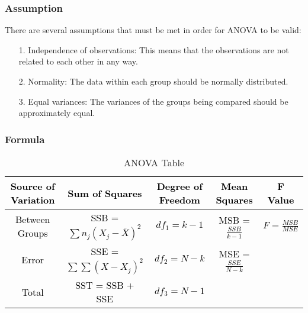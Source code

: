 \documentclass[a4paper]{article}
\begin{document}
	\subsubsection{Assumption}
	There are several assumptions that must be met in order for ANOVA to be valid:
	\begin{itemize}
		\item [1.]Independence of observations: This means that the observations are not related to each other in any way.
		\item [2.]Normality: The data within each group should be normally distributed.
		
		\item [3.]Equal variances: The variances of the groups being compared should be approximately equal.
	\end{itemize}
	\subsubsection{Formula}
	\begin{table}[htbp]
		\centering
		\caption{ANOVA Table}
		\label{tab:anova_table}
		\begin{tabular}{|c|c|c|c|c|}
			\hline
			\textcolor{black}{Source of Variation} & \textcolor{black}{Sum of Squares} & \textcolor{black}{Degree of Freedom} & \textcolor{black}{Mean Squares} & \textcolor{black}{F Value} \\
			\hline
			\textcolor{black}{Between Groups} & \textcolor{black}{SSB = \textcolor{black}{\( \sum n_j (X_j - \bar{X})^2 \)}} & \textcolor{black}{\( df_1 = k - 1 \)} & \textcolor{black}{MSB = \( \frac{SSB}{k - 1} \)} & \textcolor{black}{\( F = \frac{MSB}{MSE} \)} \\
			\hline
			\textcolor{black}{Error} & \textcolor{black}{SSE = \( \sum \sum (X - X_j)^2 \)} & \textcolor{black}{\( df_2 = N - k \)} & \textcolor{black}{MSE = \( \frac{SSE}{N - k} \)} & \textcolor{black}{} \\
			\hline
			\textcolor{black}{Total} & \textcolor{black}{SST = SSB + SSE} & \textcolor{black}{\( df_3 = N - 1 \)} & \textcolor{black}{} & \textcolor{black}{} \\
			\hline
		\end{tabular}
	\end{table}
\end{document}

